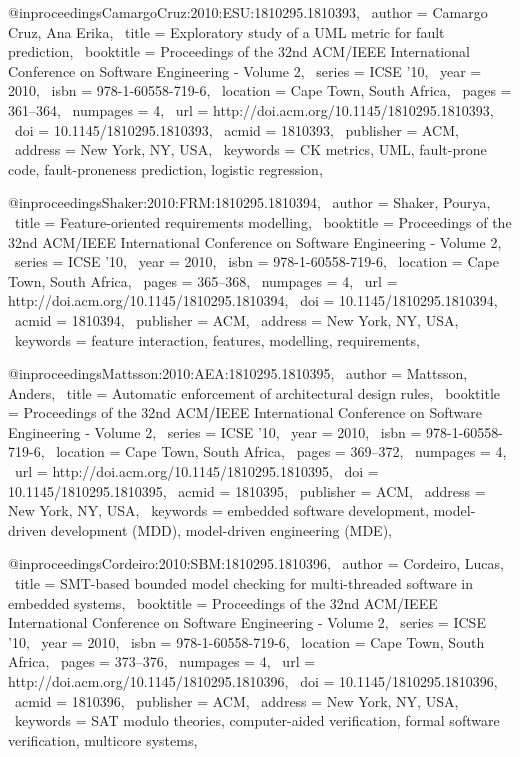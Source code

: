 @inproceedings{CamargoCruz:2010:ESU:1810295.1810393,
 author = {Camargo Cruz, Ana Erika},
 title = {Exploratory study of a UML metric for fault prediction},
 booktitle = {Proceedings of the 32nd ACM/IEEE International Conference on Software Engineering - Volume 2},
 series = {ICSE '10},
 year = {2010},
 isbn = {978-1-60558-719-6},
 location = {Cape Town, South Africa},
 pages = {361--364},
 numpages = {4},
 url = {http://doi.acm.org/10.1145/1810295.1810393},
 doi = {10.1145/1810295.1810393},
 acmid = {1810393},
 publisher = {ACM},
 address = {New York, NY, USA},
 keywords = {CK metrics, UML, fault-prone code, fault-proneness prediction, logistic regression},
} 

@inproceedings{Shaker:2010:FRM:1810295.1810394,
 author = {Shaker, Pourya},
 title = {Feature-oriented requirements modelling},
 booktitle = {Proceedings of the 32nd ACM/IEEE International Conference on Software Engineering - Volume 2},
 series = {ICSE '10},
 year = {2010},
 isbn = {978-1-60558-719-6},
 location = {Cape Town, South Africa},
 pages = {365--368},
 numpages = {4},
 url = {http://doi.acm.org/10.1145/1810295.1810394},
 doi = {10.1145/1810295.1810394},
 acmid = {1810394},
 publisher = {ACM},
 address = {New York, NY, USA},
 keywords = {feature interaction, features, modelling, requirements},
} 

@inproceedings{Mattsson:2010:AEA:1810295.1810395,
 author = {Mattsson, Anders},
 title = {Automatic enforcement of architectural design rules},
 booktitle = {Proceedings of the 32nd ACM/IEEE International Conference on Software Engineering - Volume 2},
 series = {ICSE '10},
 year = {2010},
 isbn = {978-1-60558-719-6},
 location = {Cape Town, South Africa},
 pages = {369--372},
 numpages = {4},
 url = {http://doi.acm.org/10.1145/1810295.1810395},
 doi = {10.1145/1810295.1810395},
 acmid = {1810395},
 publisher = {ACM},
 address = {New York, NY, USA},
 keywords = {embedded software development, model-driven development (MDD), model-driven engineering (MDE)},
} 

@inproceedings{Cordeiro:2010:SBM:1810295.1810396,
 author = {Cordeiro, Lucas},
 title = {SMT-based bounded model checking for multi-threaded software in embedded systems},
 booktitle = {Proceedings of the 32nd ACM/IEEE International Conference on Software Engineering - Volume 2},
 series = {ICSE '10},
 year = {2010},
 isbn = {978-1-60558-719-6},
 location = {Cape Town, South Africa},
 pages = {373--376},
 numpages = {4},
 url = {http://doi.acm.org/10.1145/1810295.1810396},
 doi = {10.1145/1810295.1810396},
 acmid = {1810396},
 publisher = {ACM},
 address = {New York, NY, USA},
 keywords = {SAT modulo theories, computer-aided verification, formal software verification, multicore systems},
} 

